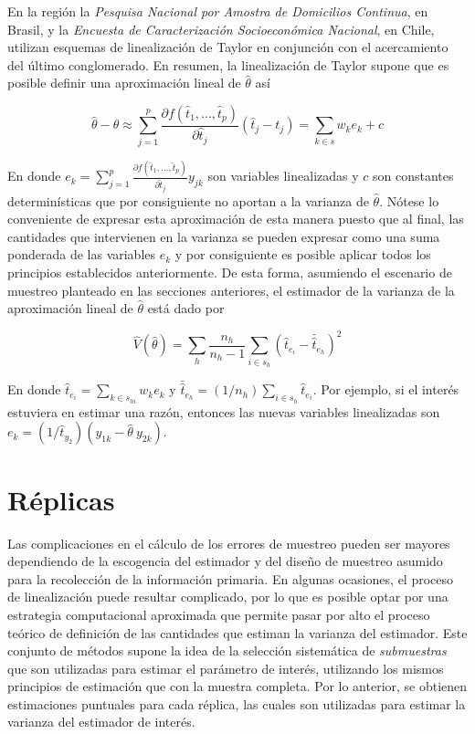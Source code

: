 \documentclass[
  10pt,
  spanish,
]{book}
\begin{document}
En la región la \emph{Pesquisa Nacional por Amostra de Domicilios Continua}, en Brasil, y la \emph{Encuesta de Caracterización Socioeconómica Nacional}, en Chile, utilizan esquemas de linealización de Taylor en conjunción con el acercamiento del último conglomerado. En resumen, la linealización de Taylor supone que es posible definir una aproximación lineal de \(\hat{\theta}\) así

\[
\hat{\theta} - \theta 
\approx \sum_{j=1}^p \frac{\partial f(\hat{t}_1, \ldots, \hat{t}_p) }{\partial \hat{t}_j}(\hat{t}_j - t_j)
= \sum_{k\in s} w_k e_k + c
\]

En donde \(e_k= \sum_{j=1}^p \frac{\partial f(\hat{t}_1, \ldots, \hat{t}_p) }{\partial \hat{t}_j} y_{jk}\) son variables linealizadas y \(c\) son constantes determinísticas que por consiguiente no aportan a la varianza de \(\hat{\theta}\). Nótese lo conveniente de expresar esta aproximación de esta manera puesto que al final, las cantidades que intervienen en la varianza se pueden expresar como una suma ponderada de las variables \(e_k\) y por consiguiente es posible aplicar todos los principios establecidos anteriormente. De esta forma, asumiendo el escenario de muestreo planteado en las secciones anteriores, el estimador de la varianza de la aproximación lineal de \(\hat{\theta}\) está dado por

\[
\hat{V}(\hat{\theta}) = 
\sum_h\frac{n_h}{n_h-1}\sum_{i\in s_h}\left(\hat{t}_{e_i}-\bar{\hat{t}}_{e_h}\right)^2
\]

En donde \(\hat{t}_{e_i} = \sum_{k \in s_{hi}} w_k e_k\) y \(\bar{\hat{t}}_{e_h}=(1/n_h)\sum_{i \in s_h}\hat{t}_{e_i}\). Por ejemplo, si el interés estuviera en estimar una razón, entonces las nuevas variables linealizadas son \(e_k=(1/\hat{t}_{y_2})(y_{1k}-\hat{\theta} \ y_{2k})\).

\hypertarget{ruxe9plicas}{%
\section{Réplicas}\label{ruxe9plicas}}

Las complicaciones en el cálculo de los errores de muestreo pueden ser mayores dependiendo de la escogencia del estimador y del diseño de muestreo asumido para la recolección de la información primaria. En algunas ocasiones, el proceso de linealización puede resultar complicado, por lo que es posible optar por una estrategia computacional aproximada que permite pasar por alto el proceso teórico de definición de las cantidades que estiman la varianza del estimador. Este conjunto de métodos supone la idea de la selección sistemática de \emph{submuestras} que son utilizadas para estimar el parámetro de interés, utilizando los mismos principios de estimación que con la muestra completa. Por lo anterior, se obtienen estimaciones puntuales para cada réplica, las cuales son utilizadas para estimar la varianza del estimador de interés.
\end{document}
